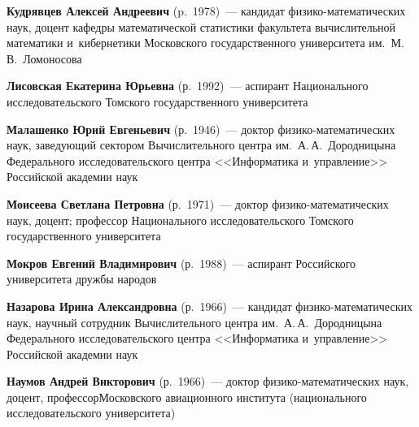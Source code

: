 \begin{multicols}{2}
\vspace*{3pt}

\noindent
\textbf{Кудрявцев Алексей Андреевич} (p.\ 1978)~--- кандидат 
фи\-зи\-ко-ма\-те\-ма\-ти\-че\-ских наук, 
доцент кафедры математической статистики факультета вычислительной математики 
и~кибернетики Московского государственного университета им.\ М.\,В.~Ломоносова

\vspace*{3pt}

\noindent
\textbf{Лисовская Екатерина Юрьевна} (р.\ 1992)~--- 
аспирант Национального исследовательского 
Томского государственного университета 

\vspace*{3pt}

\noindent
\textbf{Малашенко Юрий Евгеньевич} (р.\ 1946)~---
доктор фи\-зи\-ко-ма\-те\-ма\-ти\-че\-ских наук, заведующий сектором 
Вычислительного центра им.\ А.\,А.~Дородницына Федерального исследовательского центра 
<<Информатика и~управ\-ле\-ние>> Российской академии \mbox{наук}

\vspace*{3pt}


\noindent
\textbf{Моисеева Светлана Петровна} (р.\ 1971)~--- 
доктор фи\-зи\-ко-ма\-те\-ма\-ти\-че\-ских наук, доцент; 
профессор Национального исследовательского Томского государственного 
университета  

\pagebreak

\noindent
\textbf{Мокров Евгений Владимирович} (р.\ 1988)~--- 
аспирант Российского университета дружбы народов 

\vspace*{3pt}

\noindent
\textbf{Назарова Ирина Александровна} (р.\ 1966)~---
 кандидат фи\-зи\-ко-ма\-те\-ма\-ти\-че\-ских наук, научный сотрудник 
 Вычислительного центра им.\ А.\,А.~Дородницына Федерального исследовательского центра 
 <<Информатика и~управ\-ле\-ние>> Российской академии наук

\vspace*{3pt}

\noindent
\textbf{Наумов Андрей Викторович} (р.\ 1966)~--- 
доктор фи\-зи\-ко-ма\-те\-ма\-ти\-че\-ских наук, доцент, 
профессор\linebreak Московского авиационного института (национального исследовательского 
университета)

\vspace*{3pt}


\end{multicols}
